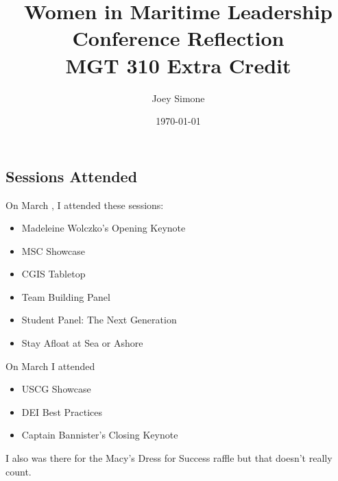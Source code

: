 \documentclass{article}
\title{Women in Maritime Leadership Conference Reflection\\MGT 310 Extra Credit}
\author{Joey Simone}
\date{\today}
\begin{document}
\maketitle
\subsection*{Sessions Attended}
On March , I attended these sessions: \begin{itemize}
    \item Madeleine Wolczko's Opening Keynote
    \item MSC Showcase
    \item CGIS Tabletop
    \item Team Building Panel
    \item Student Panel: The Next Generation
    \item Stay Afloat at Sea or Ashore
\end{itemize}
On March  I attended \begin{itemize}
    \item USCG Showcase
    \item DEI Best Practices
    \item Captain Bannister's Closing Keynote
\end{itemize}
I also was there for the Macy's Dress for Success raffle but that doesn't really count.
\end{document}
